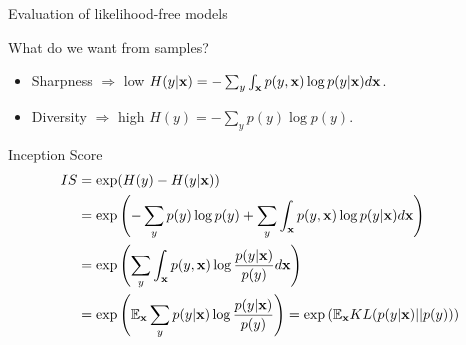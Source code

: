 \documentclass{beamer}
\begin{document}
\begin{frame}{Evaluation of likelihood-free models}
		\begin{block}{What do we want from samples?}
		\begin{itemize}
			\item Sharpness $\Rightarrow$ low $H(y | \mathbf{x}) = - \sum_{y} \int_{\mathbf{x}} p(y, \mathbf{x}) \log p(y | \mathbf{x}) d\mathbf{x}$.
			\item Diversity $\Rightarrow$ high $H(y)  = - \sum_{y} p(y) \log p(y)$.
		\end{itemize}
	\end{block}
	\begin{block}{Inception Score}
		\vspace{-0.3cm}
		\footnotesize
		\begin{align*}
			IS &= \exp(H(y) - H(y | \mathbf{x})) \\ 
			&= \exp \left( - \sum_{y} p(y) \log p(y) + \sum_{y} \int_{\mathbf{x}} p(y, \mathbf{x}) \log p(y | \mathbf{x}) d\mathbf{x}\right) \\
			&= \exp \left( \sum_{y} \int_{\mathbf{x}} p(y, \mathbf{x}) \log \frac{p(y | \mathbf{x})}{p(y)} d\mathbf{x}\right) \\ 
			&= \exp \left( \mathbb{E}_{\mathbf{x}} \sum_{y} p(y | \mathbf{x}) \log \frac{p(y | \mathbf{x})}{p(y)} \right) = \exp \left( \mathbb{E}_{\mathbf{x}} KL(p(y | \mathbf{x}) || p(y)) \right)
		\end{align*}
	\end{block}
\end{frame}
\end{document}

